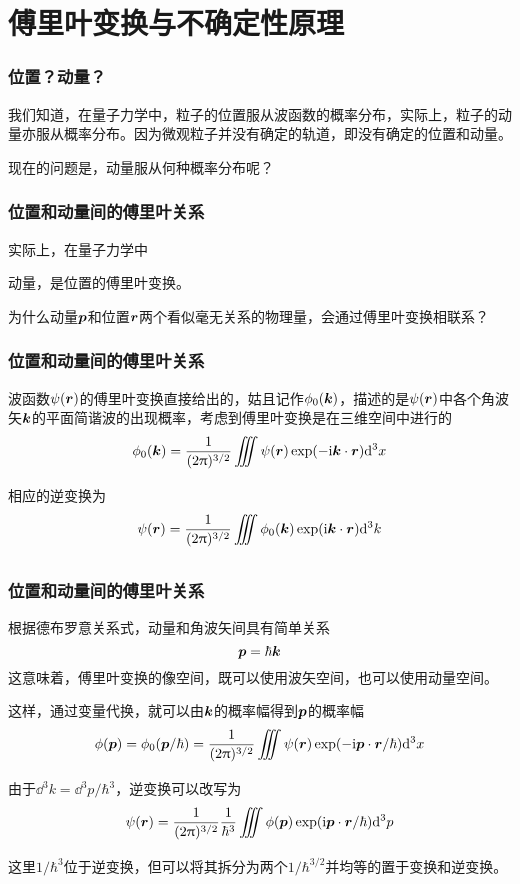 \section{傅里叶变换与不确定性原理}

\begin{frame}
    \frametitle{位置？动量？}
    我们知道，在量子力学中，粒子的位置服从波函数的概率分布，实际上，粒子的动量亦服从概率分布。因为微观粒子并没有确定的轨道，即没有确定的位置和动量。

    现在的问题是，动量服从何种概率分布呢？
\end{frame}

\begin{frame}
    \frametitle{位置和动量间的傅里叶关系}
    实际上，在量子力学中
    \begin{center}
        动量，是位置的傅里叶变换。
    \end{center}

    为什么动量$\vb*{p}$和位置$\vb*{r}$两个看似毫无关系的物理量，会通过傅里叶变换相联系？
\end{frame}

\begin{frame}
    \frametitle{位置和动量间的傅里叶关系}
    波函数$\psi(\vb*{r})$的傅里叶变换直接给出的，姑且记作$\phi_0(\vb*{k})$，描述的是$\psi(\vb*{r})$中各个角波矢$\vb*{k}$的平面简谐波的出现概率，考虑到傅里叶变换是在三维空间中进行的
    \begin{equation}
        \phi_0(\vb*{k})=\frac{1}{(2\pi)^{3/2}}\Itnt\psi(\vb*{r})\exp(-\i\vb*{k}\cdot\vb*{r})\dd^3x
    \end{equation}
    相应的逆变换为
    \begin{equation}
        \psi(\vb*{r})=\frac{1}{(2\pi)^{3/2}}\Itnt\phi_0(\vb*{k})\exp(\i\vb*{k}\cdot\vb*{r})\dd^3k
    \end{equation}
\end{frame}

\begin{frame}
    \frametitle{位置和动量间的傅里叶关系}
    根据德布罗意关系式，动量和角波矢间具有简单关系
    \begin{equation}
        \vb*{p}=\hbar\vb*{k}
    \end{equation}
    这意味着，傅里叶变换的像空间，既可以使用波矢空间，也可以使用动量空间。
\end{frame}

\begin{frame}
    这样，通过变量代换，就可以由$\vb*{k}$的概率幅得到$\vb*{p}$的概率幅
    \begin{equation}
        \phi(\vb*{p})=
        \phi_0(\vb*{p}/\hbar)=
        \frac{1}{(2\pi)^{3/2}}\Itnt\psi(\vb*{r})
        \exp(-\i\vb*{p}\cdot\vb*{r}/\hbar)\dd^3x
    \end{equation}
    由于$\dd^3k=\dd^3p/\hbar^3$，逆变换可以改写为
    \begin{equation}
        \psi(\vb*{r})=\frac{1}{(2\pi)^{3/2}}\frac{1}{\hbar^3}\Itnt\phi(\vb*{p})\exp(\i\vb*{p}\cdot\vb*{r}/\hbar)\dd^3p
    \end{equation}
    这里$1/\hbar^3$位于逆变换，但可以将其拆分为两个$1/\hbar^{3/2}$并均等的置于变换和逆变换。
\end{frame}

